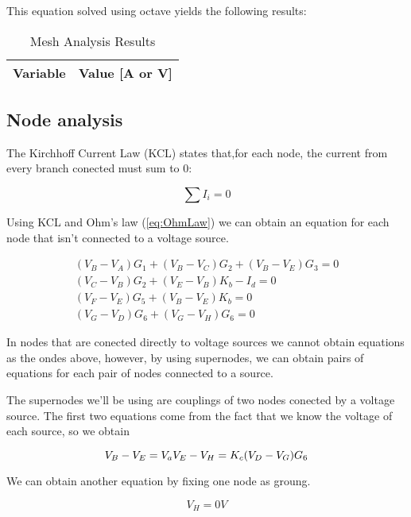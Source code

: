 This equation solved using octave yields the following results:

\begin{table}[H]
    \centering
    \begin{tabular}{|l|r|}
      \hline    
      {\bf Variable} & {\bf Value [A or V]} \\ \hline
      
    \end{tabular}
    \caption{Mesh Analysis Results}
    \label{tab:meshA}
  \end{table}

\subsection{Node analysis}
The Kirchhoff Current Law (KCL) states that,for each node, the current from every branch conected must sum to 0:

\begin{equation}
  \sum I_i = 0
  \label{eq:KCL}
\end{equation}


Using KCL and Ohm's law (\ref{eq:OhmLaw}) we can obtain an equation for each node that isn't connected to a voltage source.

\begin{align}
  (V_B-V_A)G_1+(V_B-V_C)G_2+(V_B-V_E)G_3=0\\
  (V_C-V_B)G_2+(V_E-V_B)K_b-I_d=0\\
  (V_F-V_E)G_5+(V_B-V_E)K_b=0\\
  (V_G-V_D)G_6+(V_G-V_H)G_6=0
  \label{eq:nodos}
\end{align}


In nodes that are conected directly to voltage sources we cannot obtain equations as the ondes above, however, by using supernodes, we can obtain pairs of equations for each pair of nodes connected to a source.
\par
The supernodes we'll be using are couplings of two nodes conected by a voltage source. The first two equations come from the fact that we know the voltage of each source, so we obtain

 \begin{equation}
  V_B-V_E=V_a\\
  V_E-V_H=K_c(V_D-V_G)G_6
  \label{eq:supenodosV}
\end{equation}

We can obtain another equation by fixing one node as groung.

 \begin{equation}
  V_H = 0V
  \label{eq:supenodosGND}
\end{equation}


